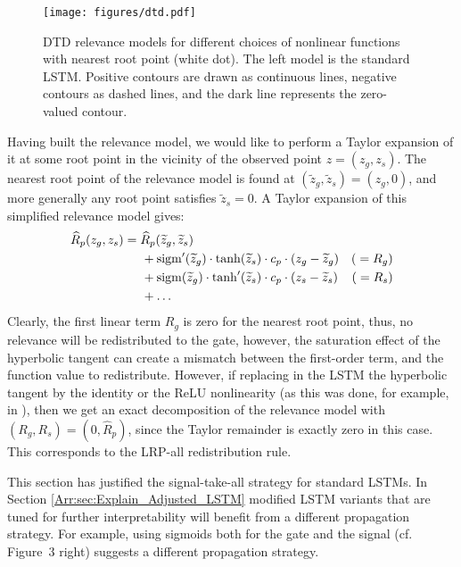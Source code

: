 \documentclass[runningheads]{llncs}
\begin{document}
\begin{figure}
    \centering
    \texttt{[image: figures/dtd.pdf]}
    \vskip -3mm
    \caption{DTD relevance models for different choices of nonlinear functions with nearest root point (white dot). The left model is the standard LSTM. Positive contours are drawn as continuous lines, negative contours as dashed lines, and the dark line represents the zero-valued contour.}
    \label{Arr:fig:dtd}
\end{figure}

Having built the relevance model, we would like to perform a Taylor expansion of it at some root point in the vicinity of the observed point $z = (z_g,z_s)$. The nearest root point of the relevance model is found at $(\widetilde{z}_g,\widetilde{z}_s) = (z_g,0)$, and more generally any root point satisfies $\widetilde{z}_s=0$. A Taylor expansion of this simplified relevance model gives:
\begin{align*}
\widehat{R}_p(z_g,z_s) &= \widehat{R}_p(\widetilde{z}_g,\widetilde{z}_s)\\
& \hspace{5mm} + \mathrm{sigm}^\prime (\widetilde{z}_g) \cdot \tanh(\widetilde{z}_s) \cdot c_p \cdot (z_g - \widetilde{z}_g)  & ({} = R_g)\\
& \hspace{5mm} + \mathrm{sigm} (\widetilde{z}_g) \cdot \tanh'(\widetilde{z}_s) \cdot c_p \cdot (z_s - \widetilde{z}_s) &  ({} = R_s)\\
& \hspace{5mm} + \dots
\end{align*}
Clearly, the first linear term $R_g$ is zero for the nearest root point, thus, no relevance will be redistributed to the gate, however, the saturation effect of the hyperbolic tangent can create a mismatch between the first-order term, and the function value to redistribute. However, if replacing in the LSTM the hyperbolic tangent by the identity or the ReLU nonlinearity (as this was done, for example, in \cite{Arr:rieger2018structuring}), then we get an
exact decomposition of the relevance model with $(R_g,R_s) = (0,\widehat{R}_p)$, since the Taylor remainder is exactly zero in this case.
This corresponds to the LRP-all redistribution rule.
\medskip

This section has justified the signal-take-all strategy for standard LSTMs. In Section \ref{Arr:sec:Explain_Adjusted_LSTM} modified LSTM variants that are tuned for further interpretability will benefit from a different propagation strategy. For example, using sigmoids both for the gate and the signal (cf. Figure~3 right) suggests a different propagation strategy. 
\end{document}
